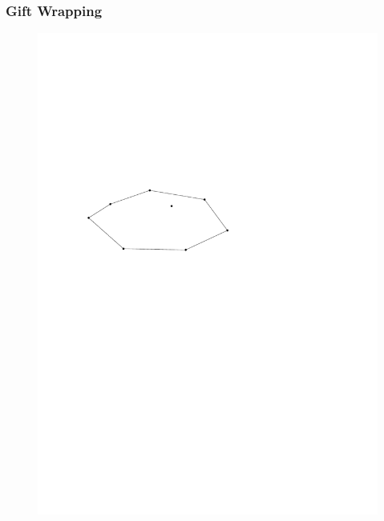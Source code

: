 \begin{frame}
	\frametitle{{Gift Wrapping}}
\begin{figure}[htbp]
	\begin{center}
  	\includegraphics[width=.8\linewidth]{bilder/punkteHulle}
	\end{center}
\end{figure}
\end{frame}


